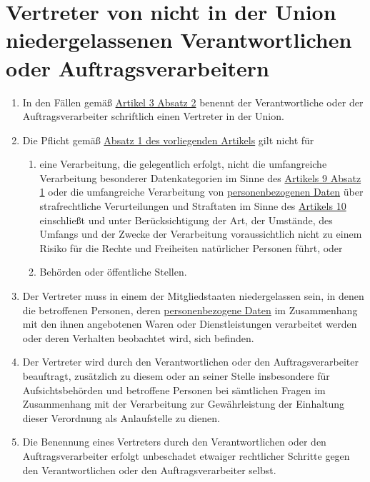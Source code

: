 \chapter{Vertreter von nicht in der Union niedergelassenen Verantwortlichen oder Auftragsverarbeitern}
\label{ch:27}


\begin{enumerate}

  \item In den Fällen gemäß \hyperref[itm:03-2]{Artikel 3 Absatz 2} benennt der Verantwortliche oder der
   Auftragsverarbeiter schriftlich einen Vertreter in der Union.
  \label{itm:27-1}

  \item Die Pflicht gemäß \hyperref[itm:27-1]{Absatz 1 des vorliegenden Artikels} gilt nicht für
  \label{itm:27-2}

  \begin{enumerate}
  
    \item eine Verarbeitung, die gelegentlich erfolgt, nicht die umfangreiche Verarbeitung besonderer Datenkategorien im
     Sinne des \hyperref[itm:09-1]{Artikels 9 Absatz 1} oder die umfangreiche Verarbeitung von \hyperref[itm:04-1]{personenbezogenen Daten}
     über strafrechtliche Verurteilungen und Straftaten im Sinne des \hyperref[ch:10]{Artikels 10} einschließt und
     unter Berücksichtigung der Art, der Umstände, des Umfangs und der Zwecke der Verarbeitung voraussichtlich nicht zu
     einem Risiko für die Rechte und Freiheiten natürlicher Personen führt, oder
    \label{itm:27-2a}

    \item Behörden oder öffentliche Stellen.
    \label{itm:27-2b}

  \end{enumerate}

  \item Der Vertreter muss in einem der Mitgliedstaaten niedergelassen sein, in denen die betroffenen Personen, deren
   \hyperref[itm:04-1]{personenbezogene Daten} im Zusammenhang mit den ihnen angebotenen Waren oder Dienstleistungen verarbeitet werden oder
   deren Verhalten beobachtet wird, sich befinden.
  \label{itm:27-3}

  \item Der Vertreter wird durch den Verantwortlichen oder den Auftragsverarbeiter beauftragt, zusätzlich zu diesem oder
   an seiner Stelle insbesondere für Aufsichtsbehörden und betroffene Personen bei sämtlichen Fragen im Zusammenhang
   mit der Verarbeitung zur Gewährleistung der Einhaltung dieser Verordnung als Anlaufstelle zu dienen.
  \label{itm:27-4}

  \item Die Benennung eines Vertreters durch den Verantwortlichen oder den Auftragsverarbeiter erfolgt unbeschadet
   etwaiger rechtlicher Schritte gegen den Verantwortlichen oder den Auftragsverarbeiter selbst.
  \label{itm:27-5}

\end{enumerate}



